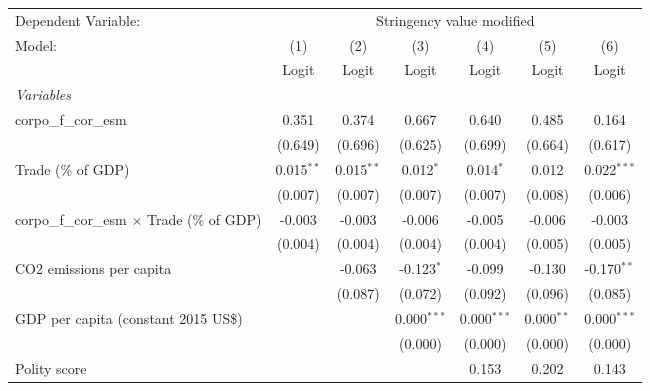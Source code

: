 
\begingroup
\centering
\begin{tabular}{lcccccc}
   \toprule
   Dependent Variable: & \multicolumn{6}{c}{Stringency value modified}\\
   Model:                                             & (1)          & (2)          & (3)           & (4)           & (5)          & (6)\\  
                                                      &  Logit       & Logit        & Logit         & Logit         & Logit        & Logit\\  
   \midrule
   \emph{Variables}\\
   corpo\_f\_cor\_esm                                 & 0.351        & 0.374        & 0.667         & 0.640         & 0.485        & 0.164\\   
                                                      & (0.649)      & (0.696)      & (0.625)       & (0.699)       & (0.664)      & (0.617)\\   
   Trade (\% of GDP)                                  & 0.015$^{**}$ & 0.015$^{**}$ & 0.012$^{*}$   & 0.014$^{*}$   & 0.012        & 0.022$^{***}$\\   
                                                      & (0.007)      & (0.007)      & (0.007)       & (0.007)       & (0.008)      & (0.006)\\   
   corpo\_f\_cor\_esm $\times$ Trade (\% of GDP)      & -0.003       & -0.003       & -0.006        & -0.005        & -0.006       & -0.003\\   
                                                      & (0.004)      & (0.004)      & (0.004)       & (0.004)       & (0.005)      & (0.005)\\   
   CO2 emissions per capita                           &              & -0.063       & -0.123$^{*}$  & -0.099        & -0.130       & -0.170$^{**}$\\   
                                                      &              & (0.087)      & (0.072)       & (0.092)       & (0.096)      & (0.085)\\   
   GDP per capita (constant 2015 US\$)                &              &              & 0.000$^{***}$ & 0.000$^{***}$ & 0.000$^{**}$ & 0.000$^{***}$\\   
                                                      &              &              & (0.000)       & (0.000)       & (0.000)      & (0.000)\\   
   Polity score                                       &              &              &               & 0.153         & 0.202        & 0.143\\   

\end{tabular}
